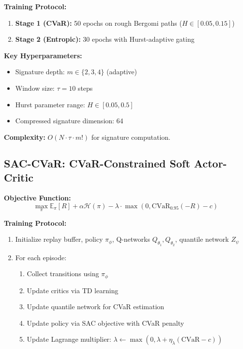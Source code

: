 \textbf{Training Protocol:}
\begin{enumerate}[noitemsep]
    \item \textbf{Stage 1 (CVaR):} 50 epochs on rough Bergomi paths ($H \in [0.05, 0.15]$)
    \item \textbf{Stage 2 (Entropic):} 30 epochs with Hurst-adaptive gating
\end{enumerate}

\textbf{Key Hyperparameters:}
\begin{itemize}[noitemsep]
    \item Signature depth: $m \in \{2, 3, 4\}$ (adaptive)
    \item Window size: $\tau = 10$ steps
    \item Hurst parameter range: $H \in [0.05, 0.5]$
    \item Compressed signature dimension: 64
\end{itemize}

\textbf{Complexity:} $O(N \cdot \tau \cdot m!)$ for signature computation.

\subsection{SAC-CVaR: CVaR-Constrained Soft Actor-Critic}

\textbf{Objective Function:}
\begin{equation}
    \max_\pi \mathbb{E}_\pi[R] + \alpha \mathcal{H}(\pi) - \lambda \cdot \max\left(0, \text{CVaR}_{0.95}(-R) - c\right)
\end{equation}

\textbf{Training Protocol:}
\begin{enumerate}[noitemsep]
    \item Initialize replay buffer, policy $\pi_\phi$, Q-networks $Q_{\theta_1}, Q_{\theta_2}$, quantile network $Z_\psi$
    \item For each episode:
    \begin{enumerate}[noitemsep]
        \item Collect transitions using $\pi_\phi$
        \item Update critics via TD learning
        \item Update quantile network for CVaR estimation
        \item Update policy via SAC objective with CVaR penalty
        \item Update Lagrange multiplier: $\lambda \gets \max(0, \lambda + \eta_\lambda(\text{CVaR} - c))$
    \end{enumerate}
\end{enumerate}


